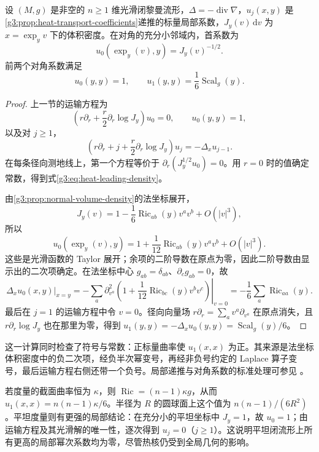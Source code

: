 \begin{proposition}\label{g3:prop:heat-diagonal-first-coefficients}
	设 \((M,g)\) 是非空的 \(n\ge1\) 维光滑闭黎曼流形，\(\Delta=-\operatorname{div}\nabla\)，\(u_j(x,y)\) 是\cref{g3:prop:heat-transport-coefficients}递推的标量局部系数，\(J_y(v)\,\mathrm dv\) 为 \(x=\exp_yv\) 下的体积密度。在对角的充分小邻域内，首系数为
	\begin{equation}\label{g3:eq:heat-leading-density}
		u_0(\exp_y(v),y)=J_y(v)^{-1/2}.
	\end{equation}
	前两个对角系数满足
	\begin{equation}\label{g3:eq:heat-first-diagonal-values}
		u_0(y,y)=1,\qquad
		u_1(y,y)=\frac16\operatorname{Scal}_g(y).
	\end{equation}
\end{proposition}
\begin{proof}
	上一节的运输方程为
	\[
		\left(r\partial_r+\frac r2\partial_r\log J_y\right)u_0=0,
		\qquad u_0(y,y)=1,
	\]
	以及对 \(j\ge1\)，
	\[
		\left(r\partial_r+j+\frac r2\partial_r\log J_y\right)u_j
		=-\Delta_xu_{j-1}.
	\]
	在每条径向测地线上，第一个方程等价于
	\(\partial_r(J_y^{1/2}u_0)=0\)。用 \(r=0\) 时的值确定常数，得到式\eqref{g3:eq:heat-leading-density}。

	由\cref{g3:prop:normal-volume-density}的法坐标展开，
	\[
		J_y(v)=1-\frac16\operatorname{Ric}_{ab}(y)v^av^b+O(|v|^3),
	\]
	所以
	\[
		u_0(\exp_y(v),y)
		=1+\frac1{12}\operatorname{Ric}_{ab}(y)v^av^b+O(|v|^3).
	\]
	这些是光滑函数的 Taylor 展开；余项的二阶导数在原点为零，因此二阶导数由显示出的二次项确定。在法坐标中心 \(g_{ab}=\delta_{ab}\)、\(\partial_cg_{ab}=0\)，故
	\[
		\left.\Delta_xu_0(x,y)\right|_{x=y}
		=-\left.\sum_a\partial_{v^a}^2
		\left(1+\frac1{12}\operatorname{Ric}_{bc}(y)v^bv^c\right)
		\right|_{v=0}
		=-\frac16\sum_a\operatorname{Ric}_{aa}(y).
	\]
	最后在 \(j=1\) 的运输方程中令 \(v=0\)。径向向量场
	\(r\partial_r=\sum_av^a\partial_{v^a}\) 在原点消失，且
	\(r\partial_r\log J_y\) 也在那里为零，得到
	\(u_1(y,y)=-\Delta_xu_0(y,y)=\operatorname{Scal}_g(y)/6\)。
\end{proof}

这一计算同时检查了符号与常数：正标量曲率使 \(u_1(x,x)\) 为正。其来源是法坐标体积密度中的负二次项，经负半次幂变号，再经非负号约定的 Laplace 算子变号，最后运输方程右侧还带一个负号。局部递推与对角系数的标准处理可参见 \cite[第2章，2.5--2.6节]{BerlineGetzlerVergne2004}。

\begin{example}\label{g3:exm:constant-curvature-heat-coefficient}
	若度量的截面曲率恒为 \(\kappa\)，则
	\(\operatorname{Ric}=(n-1)\kappa g\)，从而
	\(u_1(x,x)=n(n-1)\kappa/6\)。半径为 \(R\) 的圆球面上这个值为 \(n(n-1)/(6R^2)\)。平坦度量则有更强的局部结论：在充分小的平坦坐标中 \(J_y=1\)，故 \(u_0=1\)；由运输方程及其光滑解的唯一性，逐次得到 \(u_j=0\)（\(j\ge1\)）。这说明平坦闭流形上所有更高的局部幂次系数均为零，尽管热核仍受到全局几何的影响。
\end{example}

